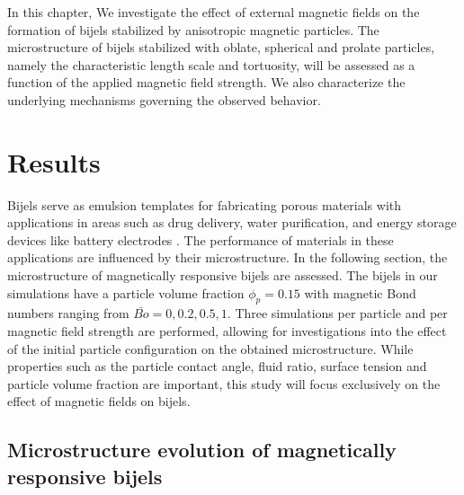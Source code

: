 In this chapter, We investigate the effect of external magnetic fields on the formation of bijels stabilized by 
anisotropic magnetic particles. The microstructure of bijels stabilized with oblate, spherical and prolate particles, 
namely the characteristic length scale and tortuosity, will be assessed as a function of the applied magnetic field
strength. We also characterize the underlying mechanisms governing the observed behavior. 


\section{Results}\label{sec:results_p1}

Bijels serve as emulsion templates for fabricating porous materials with applications in areas such as drug delivery, water purification, and energy 
storage devices like battery electrodes \cite{vanoli_bijels_2022, chen_pore-scale_2022, lu_controllable_2020, garcia_scalable_2019}. The performance of
materials in these applications are influenced by their microstructure. In the following section, the microstructure of magnetically responsive bijels
are assessed. The bijels in our simulations have a particle volume fraction $\phi_p = 0.15$ with magnetic Bond numbers ranging from 
$\bar{Bo} = 0, 0.2, 0.5, 1$. Three simulations per particle and per magnetic field strength are performed, allowing for investigations into the effect of
the initial particle configuration on the obtained microstructure. While properties such as the particle contact angle, fluid ratio, surface tension and
particle volume fraction are important, this study will focus exclusively on the effect of magnetic fields on bijels. 
\cite{jansen_bijels_2011, hijnen_bijels_2015}

\subsection{Microstructure evolution of magnetically responsive bijels}

